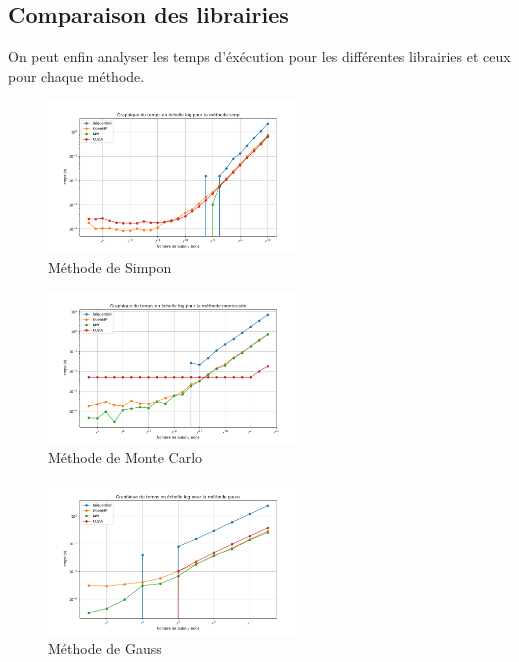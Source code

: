 \documentclass[10pt,a4paper]{article}
\begin{document}
\subsection*{Comparaison des librairies}

On peut enfin analyser les temps d'éxécution pour les différentes librairies et ceux pour chaque méthode. 

\begin{figure}[ht!]
    \centering
    \includegraphics[width=0.6\textwidth]{../Images/time_simp.png}
    \caption{Méthode de Simpon}
\end{figure}

\begin{figure}[ht!]
  \centering
  \includegraphics[width=0.6\textwidth]{../Images/time_montecarlo.png}
  \caption{Méthode de Monte Carlo}
\end{figure}

\begin{figure}[ht!]
  \centering
  \includegraphics[width=0.6\textwidth]{../Images/time_gauss.png}
  \caption{Méthode de Gauss}
\end{figure}
\end{document}
